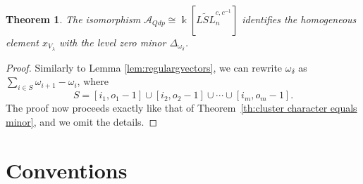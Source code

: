 \documentclass[12pt]{amsart}
\newcommand{\cA}{\mathcal{A}}
\newcommand{\kk}{\Bbbk}%
\newtheorem{theorem}{Theorem}[section]
\theoremstyle{remark}
\numberwithin{equation}{section}
\numberwithin{figure}{section}
\begin{document}
\begin{theorem}
The isomorphism $\cA_{Qdp} \cong \kk[\widetilde{LSL}_n^{c,c^{-1}}]$ identifies the homogeneous element $x_{V_\lambda}$ with the level zero minor $\Delta_{\omega_\delta}$. 
\end{theorem}
\begin{proof}
Similarly to Lemma \ref{lem:regulargvectors}, we can rewrite $\omega_\delta$ as $\sum_{i \in S} \omega_{i+1} - \omega_i$, where
\[
S=[i_1,o_1-1] \cup [i_2,o_2-1] \cup \cdots \cup [i_m,o_m-1].
\]
The proof now proceeds exactly like that of Theorem~\ref{th:cluster character equals minor}, and we omit the details. 
\end{proof}




\section{Conventions}
\end{document}
